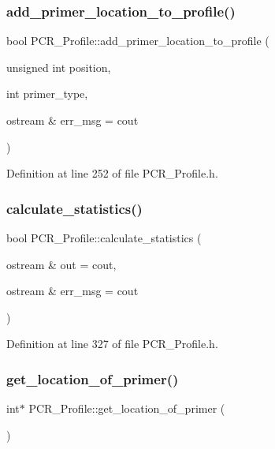 \subsubsection{\texorpdfstring{add\+\_\+primer\+\_\+location\+\_\+to\+\_\+profile()}{add\_primer\_location\_to\_profile()}}
{\footnotesize\ttfamily bool P\+C\+R\+\_\+\+Profile\+::add\+\_\+primer\+\_\+location\+\_\+to\+\_\+profile (\begin{DoxyParamCaption}\item[{unsigned int}]{position,  }\item[{int}]{primer\+\_\+type,  }\item[{ostream \&}]{err\+\_\+msg = {\ttfamily cout} }\end{DoxyParamCaption})}



Definition at line 252 of file P\+C\+R\+\_\+\+Profile.\+h.

\mbox{\label{class_p_c_r___profile_a6f209d643d15a15c7a7b940e18df9497}} 
\subsubsection{\texorpdfstring{calculate\+\_\+statistics()}{calculate\_statistics()}}
{\footnotesize\ttfamily bool P\+C\+R\+\_\+\+Profile\+::calculate\+\_\+statistics (\begin{DoxyParamCaption}\item[{ostream \&}]{out = {\ttfamily cout},  }\item[{ostream \&}]{err\+\_\+msg = {\ttfamily cout} }\end{DoxyParamCaption})}



Definition at line 327 of file P\+C\+R\+\_\+\+Profile.\+h.

\mbox{\label{class_p_c_r___profile_a7f9b958200413a71f4edd93277da1765}} 
\subsubsection{\texorpdfstring{get\+\_\+location\+\_\+of\+\_\+primer()}{get\_location\_of\_primer()}}
{\footnotesize\ttfamily int$\ast$ P\+C\+R\+\_\+\+Profile\+::get\+\_\+location\+\_\+of\+\_\+primer (\begin{DoxyParamCaption}{ }\end{DoxyParamCaption})\hspace{0.3cm}{\ttfamily [inline]}}




